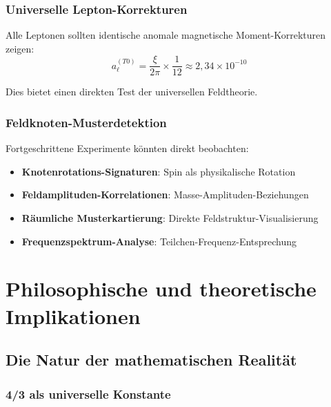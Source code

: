 	\subsubsection{Universelle Lepton-Korrekturen}
	\label{subsubsec:universelle_lepton_korrekturen}
	
	Alle Leptonen sollten identische anomale magnetische Moment-Korrekturen zeigen:
	\begin{equation}
		a_{\ell}^{(T0)} = \frac{\xi}{2\pi} \times \frac{1}{12} \approx 2{,}34 \times 10^{-10}
		\label{eq:universelle_lepton_vorhersage}
	\end{equation}
	
	Dies bietet einen direkten Test der universellen Feldtheorie.
	
	\subsubsection{Feldknoten-Musterdetektion}
	\label{subsubsec:knotenmuster_detektion}
	
	Fortgeschrittene Experimente könnten direkt beobachten:
	\begin{itemize}
		\item \textbf{Knotenrotations-Signaturen}: Spin als physikalische Rotation
		\item \textbf{Feldamplituden-Korrelationen}: Masse-Amplituden-Beziehungen
		\item \textbf{Räumliche Musterkartierung}: Direkte Feldstruktur-Visualisierung
		\item \textbf{Frequenzspektrum-Analyse}: Teilchen-Frequenz-Entsprechung
	\end{itemize}
	
	\section{Philosophische und theoretische Implikationen}
	\label{sec:philosophische_implikationen}
	
	\subsection{Die Natur der mathematischen Realität}
	\label{subsec:mathematische_realitaet}
	
	\subsubsection{4/3 als universelle Konstante}
	\label{subsubsec:vier_drittel_universell}
	
